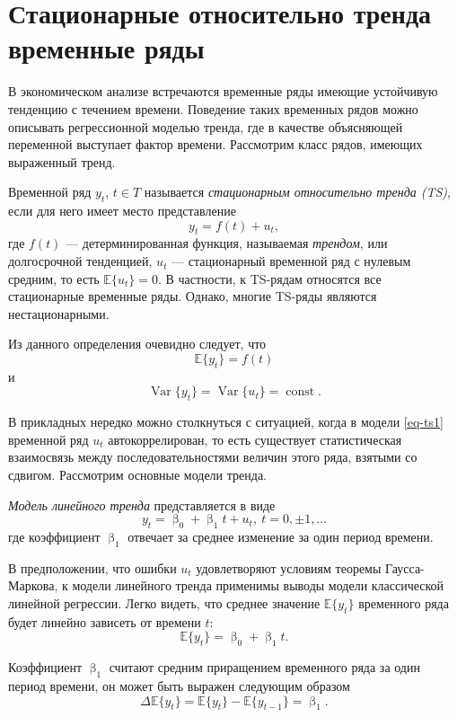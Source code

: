 \documentclass[a4paper, 14pt]{extreport}
\numberwithin{equation}{subsection}
\renewcommand{\beta}{\upbeta}
\newcommand{\E}{\mathbb E}
\newcommand{\Var}{\operatorname{Var}}
\newcommand{\const}{\operatorname{const}}
\numberwithin{equation}{section}
\begin{document}
	\section{Стационарные относительно тренда временные ряды}
	
	В экономическом анализе встречаются временные ряды имеющие устойчивую тенденцию с течением времени. Поведение таких временных рядов можно описывать регрессионной моделью тренда, где в качестве объясняющей переменной выступает фактор времени. Рассмотрим класс рядов, имеющих выраженный тренд.
	
	Временной ряд $y_t$, $t \in T$ называется \textit{стационарным относительно тренда (TS)}, если для него имеет место представление
	\begin{equation}
		y_t=f(t)+u_t,
		\label{eq-ts1}
	\end{equation}
	где $f(t)$ --- детерминированная функция, называемая \textit{трендом}, или долгосрочной тенденцией, $u_t$ --- стационарный временной ряд с нулевым средним, то есть $\E \{ u_t\} = 0$. В частности, к TS-рядам относятся все стационарные временные ряды. Однако, многие TS-ряды являются нестационарными.
	
	Из данного определения очевидно следует, что  $$\E \{y_t\}=f(t)$$ и $$\Var\{y_t\}=\Var\{u_t\}=\const.$$
	
	В прикладных нередко можно столкнуться с ситуацией, когда в модели \eqref{eq-ts1} временной ряд $u_t$ автокоррелирован, то есть существует статистическая взаимосвязь между последовательностями величин этого ряда, взятыми со сдвигом.
	Рассмотрим основные модели тренда.
	
	\textit{Модель линейного тренда} представляется в виде \begin{equation}
	y_t=\beta_0+\beta_1t+u_t,\ t = 0, \pm 1, \ldots
	\end{equation}
	где коэффициент $\beta_1$ отвечает за среднее изменение за один период времени.
	
	В предположении, что ошибки $u_t$ удовлетворяют условиям теоремы Гаусса-Маркова, к модели линейного тренда применимы выводы модели классической линейной регрессии. Легко видеть, что среднее значение $\E \{y_t\}$ временного ряда будет линейно зависеть от времени $t$:
	\begin{equation}
		\E \{y_t\}=\beta_0+\beta_1t.
	\end{equation}
	
	Коэффициент $\beta_1$ считают средним приращением временного ряда за один период времени, он может быть выражен следующим образом
	\begin{equation}
		\Delta \E \{y_t\}=\E \{y_t\}-\E \{y_{t-1}\}=\beta_1.
	\end{equation}
	
\end{document}
